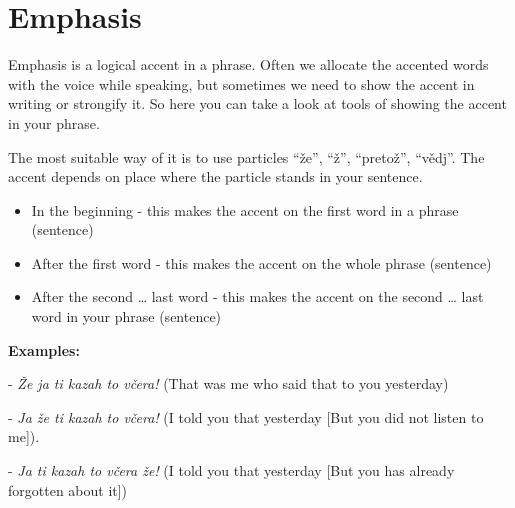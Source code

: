 \section{Emphasis}

Emphasis is a logical accent in a phrase. Often we allocate the accented words with the voice while speaking, but sometimes we need to show the accent in writing or strongify it. So here you can take a look at tools of showing the accent in your phrase.

The most suitable way of it is to use particles “že”, “ž”, “pretož”, “vědj”. The accent depends on place where the particle stands in your sentence. 

\begin{itemize}
	\item In the beginning - this makes the accent on the first word in a phrase (sentence)
	\item After the first word - this makes the accent on the whole phrase (sentence)
	\item After the second … last word - this makes the accent on the second … last word in your phrase (sentence)
\end{itemize}

\textbf{Examples:}

- \textit{Že ja ti kazah to včera!} (That was me who said that to you yesterday)

- \textit{Ja že ti kazah to včera!} (I told you that yesterday [But you did not listen to me]).

- \textit{ Ja ti kazah to včera že!} (I told you that yesterday [But you has already forgotten about it])